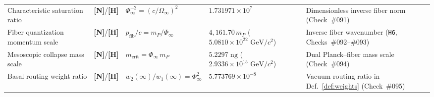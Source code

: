 \documentclass[11pt,a4paper]{article}
\newcommand{\catH}{\textbf{\textcolor{orange!85!black}{[H]}}}
\newcommand{\catN}{\textbf{\textcolor{teal!75!black}{[N]}}}
\theoremstyle{definition}
\theoremstyle{remark}
\begin{document}
\begin{table}[H]
{\begin{tabular}{@{} l c l l l @{}}
    Characteristic saturation ratio & \catN/\catH & $\Phi_{\infty}^{-2} = (c/\Omega_{\infty})^2$ & $1.731971 \times 10^7$ & Dimensionless inverse fiber norm (Check~\#091) \\
    Fiber quantization momentum scale & \catN/\catH & $p_{\text{fib}}/c = m_P / \Phi_{\infty}$ & $4{,}161.70\,m_P$ ($5.0810 \times 10^{22}\text{ GeV}/c^2$) & Inverse fiber wavenumber (\texttt{H6}, Checks~\#092--\#093) \\
    Mesoscopic collapse mass scale & \catN/\catH & $m_{\text{crit}} = \Phi_{\infty}\,m_P$ & $5.2297\text{ ng}$ ($2.9336 \times 10^{15}\text{ GeV}/c^2$) & Dual Planck--fiber mass scale (Check~\#094) \\
    Basal routing weight ratio & \catN/\catH & $w_2(\infty)/w_1(\infty) = \Phi_{\infty}^2$ & $5.773769 \times 10^{-8}$ & Vacuum routing ratio in Def.~\ref{def:weights} (Check~\#095) \\
    \bottomrule
  \end{tabular}%
  }
\end{table}
\end{document}
